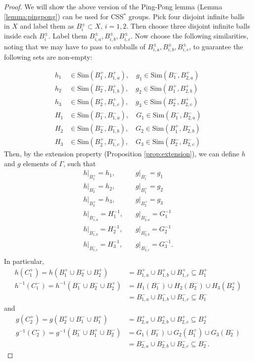 \documentclass[12pt]{amsart}
\numberwithin{equation}{subsection}
\theoremstyle{definition}
\theoremstyle{definition}
\theoremstyle{remark}
\begin{document}
\begin{proof}
    We will show the above version of the Ping-Pong lemma (Lemma \ref{lemma:pingpong}) can be used for CSS$^*$ groups. Pick four disjoint infinite balls in $X$ and label them as $B_i^\pm \subset X$, $i=1,2$. Then choose three disjoint infinite balls inside each $B_i^\pm$. Label them $B_{i,a}^\pm, B_{i,b}^\pm, B_{i,c}^\pm$. Now choose the following similarities, noting that we may have to pass to subballs of $B_{i,a}^\pm, B_{i,b}^\pm, B_{i,c}^\pm$, to guarantee the following sets are non-empty: 

    \begin{align*}
        h_1 &\in \text{Sim}(B^+_1,B_{1,a}^+), \quad g_1 \in \text{Sim}(B^-_1,B_{2,a}^+)\\ 
        h_2 &\in \text{Sim}(B^-_2,B_{1,b}^+), \quad g_2 \in \text{Sim}(B^+_1,B_{2,b}^+) \\ 
        h_3 &\in \text{Sim}(B^+_2,B_{1,c}^+), \quad g_3 \in \text{Sim}(B^+_2,B_{2,c}^+) \\
        H_1 &\in \text{Sim}(B^-_1,B_{1,a}^-), \quad G_1 \in \text{Sim}(B_1^-,B_{2,a}^-) \\
        H_2 &\in \text{Sim}(B^-_2, B_{1,b}^-), \quad G_2 \in \text{Sim}(B_1^+,B_{2,b}^-)\\
        H_3 &\in  \text{Sim}(B^+_2,B_{1,c}^-), \quad G_3 \in \text{Sim}(B_2^-,B_{2,c}^-)
    \end{align*}
Then, by the extension property (Proposition \ref{prop:extension}), we can define $h$ and $g$ elements of $\Gamma$, such that 
\begin{align*}
       h\vert_{B^+_1} = h_1,& \quad  g\vert_{B^-_1} = g_1\\ 
        h\vert_{B^-_2} = h_2,& \quad g\vert_{B^+_1} = g_2 \\
        h\vert_{B^+_2} = h_3,& \quad g\vert_{B^+_2} = g_3  \\
        h\vert_{B_{1,a}^-} = H^{-1}_1,& \quad g\vert_{B_{2,a}^-} = G^{-1}_1\\
        h\vert_{B_{1,b}^-} = H^{-1}_2,& \quad g\vert_{B_{2,b}^-} = G^{-1}_2 \\
        h\vert_{B_{1,c}^-} = H^{-1}_3,& \quad g\vert_{B_{2,c}^-} = G^{-1}_3. \\
    \end{align*}
In particular, 
\begin{align*}
    h(C_1^+) = h(B^+_1\cup B^-_2 \cup B^+_2) &= B_{1,a}^+ \cup B_{1,b}^+ \cup B_{1,c}^+ \subseteq B^+_1 \\
    h^{-1}(C_1^-) = h^{-1}(B^-_1\cup B^-_2 \cup B^+_2) &= H_1(B^-_1) \cup H_2(B^-_2) \cup H_3(B^+_2) \\
    &= B_{1,a}^- \cup B_{1,b}^- \cup B_{1,c}^- \subseteq B^-_1 
\end{align*}   
and
\begin{align*}
   g(C_2^+)= g(B^+_2\cup B^-_1 \cup B^+_1) &= B_{2,a}^+ \cup B_{2,b}^+ \cup B_{2,c}^+ \subseteq B^+_2 \\
    g^{-1}(C_2^-) =g^{-1}(B^-_1 \cup B^+_1 \cup B^-_2) &= G_1(B^-_1) \cup G_2(B^+_1) \cup G_3(B^-_2) \\
    &= B_{2,a}^- \cup B_{2,b}^- \cup B_{2,c}^- \subseteq B^-_2. 
\end{align*} 


\end{proof}
\end{document}
